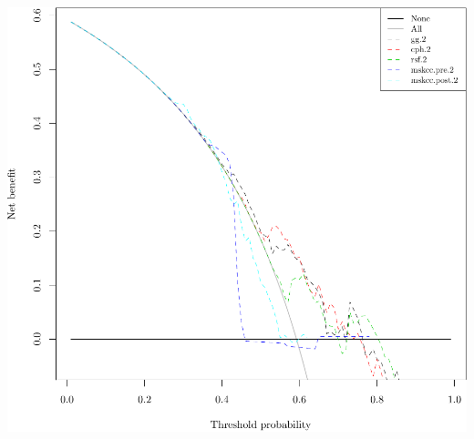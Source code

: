 \documentclass{article}\usepackage[]{graphicx}\usepackage[]{color}
\makeatletter
\def\maxwidth{ %
  \ifdim\Gin@nat@width>\linewidth
    \linewidth
  \else
    \Gin@nat@width
  \fi
}
\newenvironment{knitrout}{}{} %
\makeatother
\begin{document}
\begin{knitrout}
{\centering \includegraphics[width=\maxwidth]{figure/05-model-selection-dca-2} 

}



\end{knitrout}
\end{document}
